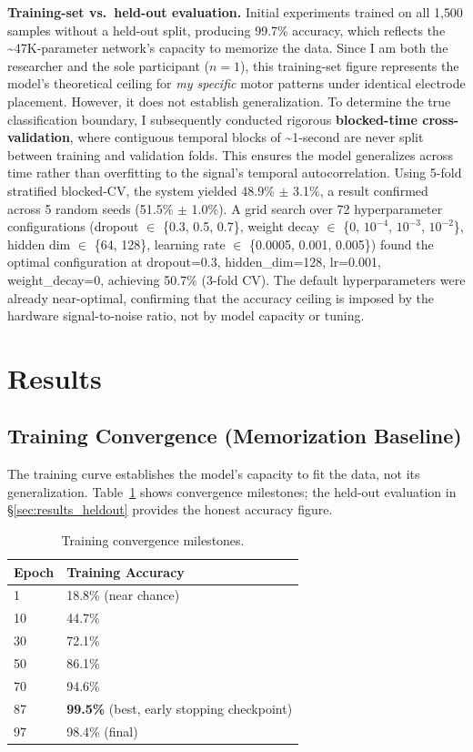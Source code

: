 \documentclass{article}
\begin{document}
\textbf{Training-set vs.\ held-out evaluation.} Initial experiments trained on all 1{,}500 samples without a held-out split, producing 99.7\% accuracy, which reflects the \textasciitilde47K-parameter network's capacity to memorize the data. Since I am both the researcher and the sole participant ($n=1$), this training-set figure represents the model's theoretical ceiling for \emph{my specific} motor patterns under identical electrode placement. However, it does not establish generalization. To determine the true classification boundary, I subsequently conducted rigorous \textbf{blocked-time cross-validation}, where contiguous temporal blocks of \textasciitilde1-second are never split between training and validation folds. This ensures the model generalizes across time rather than overfitting to the signal's temporal autocorrelation. Using 5-fold stratified blocked-CV, the system yielded 48.9\% $\pm$ 3.1\%, a result confirmed across 5 random seeds (51.5\% $\pm$ 1.0\%). A grid search over 72 hyperparameter configurations (dropout $\in$ \{0.3, 0.5, 0.7\}, weight decay $\in$ \{0, $10^{-4}$, $10^{-3}$, $10^{-2}$\}, hidden dim $\in$ \{64, 128\}, learning rate $\in$ \{0.0005, 0.001, 0.005\}) found the optimal configuration at dropout=0.3, hidden\_dim=128, lr=0.001, weight\_decay=0, achieving 50.7\% (3-fold CV). The default hyperparameters were already near-optimal, confirming that the accuracy ceiling is imposed by the hardware signal-to-noise ratio, not by model capacity or tuning.

\section{Results}
\label{sec:results}

\subsection{Training Convergence (Memorization Baseline)}

The training curve establishes the model's capacity to fit the data, not its generalization. Table~\ref{tab:training_curve} shows convergence milestones; the held-out evaluation in \S\ref{sec:results_heldout} provides the honest accuracy figure.

\begin{table}[h]
\centering
\caption{Training convergence milestones.}
\label{tab:training_curve}
\begin{tabular}{@{}ll@{}}
\toprule
Epoch & Training Accuracy \\
\midrule
1  & 18.8\% (near chance) \\
10 & 44.7\% \\
30 & 72.1\% \\
50 & 86.1\% \\
70 & 94.6\% \\
87 & \textbf{99.5\%} (best, early stopping checkpoint) \\
97 & 98.4\% (final) \\
\bottomrule
\end{tabular}
\end{table}
\end{document}

